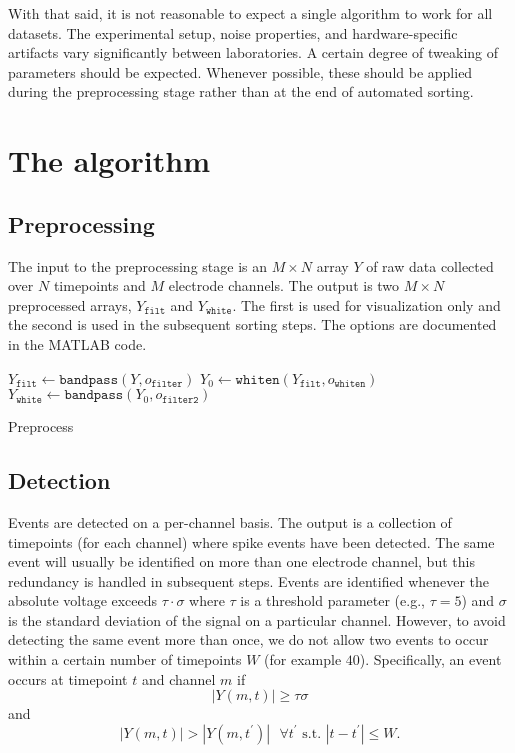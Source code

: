 \documentclass[hidelinks,10pt]{article}
\begin{document}
With that said, it is not reasonable to expect a single algorithm to work for all datasets. The experimental setup, noise properties, and hardware-specific artifacts vary significantly between laboratories. A certain degree of tweaking of parameters should be expected. Whenever possible, these should be applied during the preprocessing stage rather than at the end of automated sorting.

\section {The algorithm}

\subsection {Preprocessing}

The input to the preprocessing stage is an $M\times N$ array $Y$ of raw data collected over $N$ timepoints and $M$ electrode channels. The output is two $M\times N$ preprocessed arrays, $Y_\texttt{filt}$ and $Y_\texttt{white}$. The first is used for visualization only and the second is used in the subsequent sorting steps. The options are documented in the MATLAB code.

\begin{algorithm}
\DontPrintSemicolon %

$Y_\texttt{filt}\gets\texttt{bandpass}(Y,o_\texttt{filter})$\;
$Y_0\gets\texttt{whiten}(Y_\texttt{filt},o_\texttt{whiten})$\;
$Y_\texttt{white}\gets\texttt{bandpass}(Y_0,o_\texttt{filter2})$\;

\caption{{\sc Preprocess}}
\label{algo:preprocess}
\end{algorithm}

\subsection {Detection}

Events are detected on a per-channel basis. The output is a collection of timepoints (for each channel) where spike events have been detected. The same event will usually be identified on more than one electrode channel, but this redundancy is handled in subsequent steps. Events are identified whenever the absolute voltage exceeds $\tau\cdot \sigma$ where $\tau$ is a threshold parameter (e.g., $\tau=5$) and $\sigma$ is the standard deviation of the signal on a particular channel. However, to avoid detecting the same event more than once, we do not allow two events to occur within a certain number of timepoints $W$ (for example $40$). Specifically, an event occurs at timepoint $t$ and channel $m$ if $$|Y(m,t)|\geq \tau\sigma$$ and 
$$|Y(m,t)|>|Y(m,t^\prime)|\text{ }\forall t^\prime \text{ s.t. } |t-t^\prime|\leq W.$$
\end{document}
